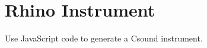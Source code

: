 \section{Rhino Instrument}\label{rhinoInstrument}

Use JavaScript code to generate a Csound instrument.
